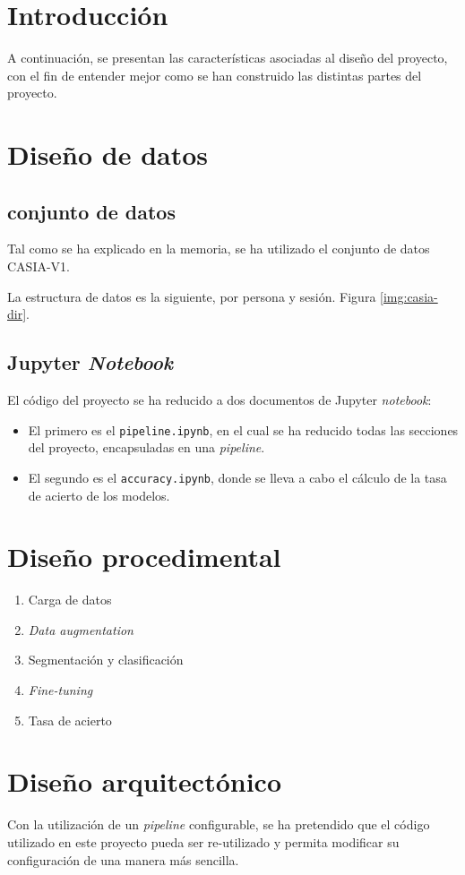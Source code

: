 
\section{Introducción}

A continuación, se presentan las características asociadas al diseño del proyecto, con el fin de entender mejor como se han construido las distintas partes del proyecto.

\section{Diseño de datos}

\subsection{conjunto de datos} \label{anx:dataset}

Tal como se ha explicado en la memoria, se ha utilizado el conjunto de datos CASIA-V1.

La estructura de datos es la siguiente, por persona y sesión. Figura \ref{img:casia-dir}.


\subsection{Jupyter \textit{Notebook}}

El código del proyecto se ha reducido a dos documentos de Jupyter \textit{notebook}:


\begin{itemize}
    \item El primero es el \texttt{pipeline.ipynb}, en el cual se ha reducido todas las secciones del proyecto, encapsuladas en una \textit{pipeline}.
    \item El segundo es el \texttt{accuracy.ipynb}, donde se lleva a cabo el cálculo de la tasa de acierto de los modelos.
\end{itemize}


\section{Diseño procedimental}

\begin{enumerate}
    \item Carga de datos
    \item \textit{Data augmentation}
    \item Segmentación y clasificación
    \item \textit{Fine-tuning}
    \item Tasa de acierto
    \end{enumerate}

\section{Diseño arquitectónico}

Con la utilización de un \textit{pipeline} configurable, se ha pretendido que el código utilizado en este proyecto pueda ser re-utilizado y permita modificar su configuración de una manera más sencilla.
